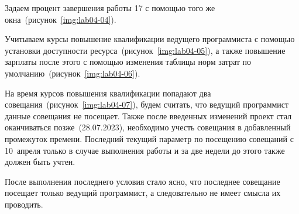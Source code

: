 
Задаем процент завершения работы 17 с помощью того же окна~(рисунок~\ref{img:lab04-04}).


Учитываем курсы повышение квалификации ведущего программиста с помощью
установки доступности ресурса~(рисунок~\ref{img:lab04-05}), а также повышение
зарплаты после этого с помощью изменения таблицы норм затрат по
умолчанию~(рисунок~\ref{img:lab04-06}).



На время курсов повышения квалификации попадают два
совещания~(рисунок~\ref{img:lab04-07}), будем считать, что ведущий программист
данные совещания не посещает. Также после введенных изменений проект стал
оканчиваться позже~(28.07.2023), необходимо учесть совещания в добавленный
промежуток премени. Последний текущий параметр по посещению совещаний с
10~апреля только в случае выполнения работы и за две недели до этого также
должен быть учтен.


После выполнения последнего условия стало ясно, что последнее совещание
посещает только ведущий программист, а следовательно не имеет смысла их
проводить.
